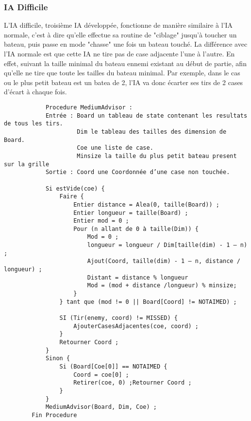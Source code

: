 \subsubsection{IA Difficile}
    L'IA difficile, troisième IA développée, fonctionne de manière similaire à l'IA normale, c'est à dire qu'elle effectue sa routine de "ciblage" jusqu'à toucher un bateau, puis passe en mode "chasse" une fois un bateau touché.
    La différence avec l'IA normale est que cette IA ne tire pas de case adjacente l'une à l'autre. En effet, suivant la taille minimal du bateau ennemi existant au début de partie, afin qu'elle ne tire que toute les tailles du bateau minimal.
    Par exemple, dans le cas ou le plus petit bateau est un batea de 2, l'IA va donc écarter ses tirs de 2 cases d'écart à chaque fois. 
    \begin{verbatim}
            Procedure MediumAdvisor :
            Entrée : Board un tableau de state contenant les resultats de tous les tirs.
                     Dim le tableau des tailles des dimension de Board.
                     Coe une liste de case.
                     Minsize la taille du plus petit bateau present sur la grille
            Sortie : Coord une Coordonnée d’une case non touchée.

            Si estVide(coe) {
                Faire {
                    Entier distance = Alea(0, taille(Board)) ;
                    Entier longueur = taille(Board) ;
                    Entier mod = 0 ;
                    Pour (n allant de 0 à taille(Dim)) {
                        Mod = 0 ;
                        longueur = longueur / Dim[taille(dim) - 1 – n) ;
                        Ajout(Coord, taille(dim) - 1 – n, distance / longueur) ;
                        Distant = distance % longueur
                        Mod = (mod + distance /longueur) % minsize;
                    }
                } tant que (mod != 0 || Board[Coord] != NOTAIMED) ;

                SI (Tir(enemy, coord) != MISSED) {
                    AjouterCasesAdjacentes(coe, coord) ;
                }   
                Retourner Coord ;
            }
            Sinon {
                Si (Board[Coe[0]] == NOTAIMED {
                    Coord = coe[0] ;
                    Retirer(coe, 0) ;Retourner Coord ;
                }
            }
            MediumAdvisor(Board, Dim, Coe) ;
        Fin Procedure
    \end{verbatim}